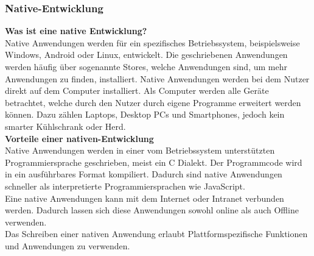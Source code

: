 \documentclass[ngerman]{article}
\begin{document}
    \subsubsection{Native-Entwicklung}
    \textbf{Was ist eine native Entwicklung?}\\
    Native Anwendungen werden für ein spezifisches Betriebssystem, beispielsweise Windows, Android oder Linux, entwickelt. Die geschriebenen Anwendungen werden häufig über sogenannte Stores, welche Anwendungen sind, um mehr Anwendungen zu finden, installiert. Native Anwendungen werden bei dem Nutzer direkt auf dem Computer installiert. Als Computer werden alle Geräte betrachtet, welche durch den Nutzer durch eigene Programme erweitert werden können. Dazu zählen Laptops, Desktop PCs und Smartphones, jedoch kein smarter Kühlschrank oder Herd. \cite{Native app vs Web app: Multi-criteria decision-making for optimised mobile solution}\\
    \textbf{Vorteile einer nativen-Entwicklung}\\
    Native Anwendungen werden in einer vom Betriebssystem unterstützten Programmiersprache geschrieben, meist ein C Dialekt. Der Programmcode wird in ein ausführbares Format kompiliert. Dadurch sind native Anwendungen schneller als interpretierte Programmiersprachen wie JavaScript.\\
    Eine native Anwendungen kann mit dem Internet oder Intranet verbunden werden. Dadurch lassen sich diese Anwendungen sowohl online als auch Offline verwenden.\cite{Native app vs Web app: Multi-criteria decision-making for optimised mobile solution}\\
    Das Schreiben einer nativen Anwendung erlaubt Plattformspezifische Funktionen und Anwendungen zu verwenden. \cite{Extending browser platforms with native capabilities}\\
\end{document}
